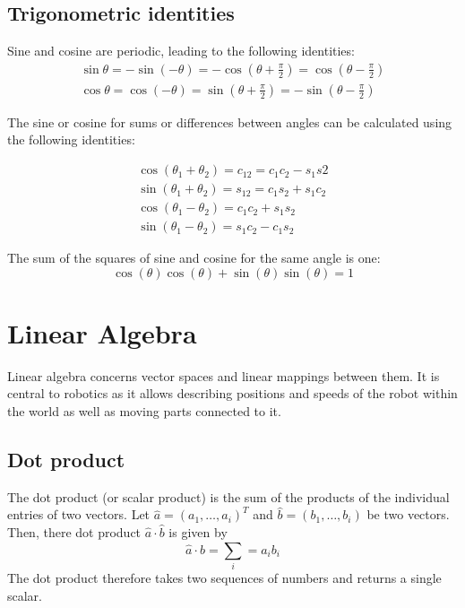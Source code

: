 \documentclass[paper=6.14in:9.21in,pagesize=pdftex,11pt,twoside,openright]{scrbook}
\begin{document}
\section{Trigonometric identities}
Sine and cosine are periodic, leading to the following identities:
\begin{eqnarray}
\sin\theta=-\sin(-\theta)=-\cos(\theta+\frac{\pi}{2})=\cos(\theta-\frac{\pi}{2})\\
\cos\theta=\cos(-\theta)=\sin(\theta+\frac{\pi}{2})=-\sin(\theta-\frac{\pi}{2})
\end{eqnarray}

The sine or cosine for sums or differences between angles can be calculated using the following identities:

\begin{eqnarray}
\cos(\theta_1+\theta_2)=c_{12}=c_1c_2-s_1s2\\
\sin(\theta_1+\theta_2)=s_{12}=c_1s_2+s_1c_2\\
\cos(\theta_1-\theta_2)=c_1c_2+s_1s_2\\
\sin(\theta_1-\theta_2)=s_1c_2-c_1s_2
\end{eqnarray}

The sum of the squares of sine and cosine for the same angle is one:
\begin{equation}
\cos(\theta)\cos(\theta)+\sin(\theta)\sin(\theta)=1
\end{equation}

\chapter{Linear Algebra}
Linear algebra concerns vector spaces and linear mappings between them. It is central to robotics as it allows describing positions and speeds of the robot within the world as well as moving parts connected to it. 

\section{Dot product}
The dot product (or scalar product) is the sum of the products of the individual entries of two vectors. Let $\hat{a}=(a_1,\ldots,a_i)^T$ and $\hat{b}=(b_1,\ldots,b_i)$ be two vectors. Then, there dot product $\hat{a}\cdot\hat{b}$ is given by
\begin{equation}
\hat{a}\cdot\hat{b}=\sum_{i}=a_ib_i
\end{equation}
The dot product therefore takes two sequences of numbers and returns a single scalar. 
\end{document}
